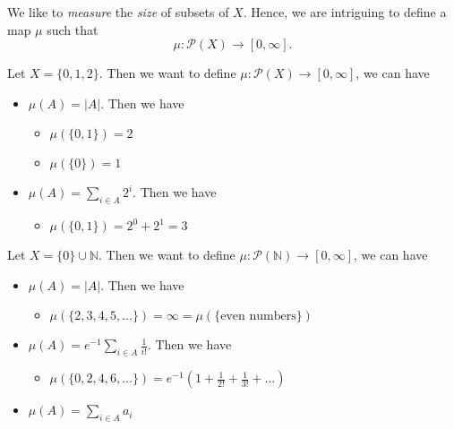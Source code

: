 We like to \emph{measure} the \emph{size} of subsets of \(X\). Hence, we are intriguing to define a map \(\mu\) such that
\[
	\mu\colon \mathcal{P}(X) \to [0, \infty].
\]
\begin{eg}
	Let \(X = \{0, 1, 2\}\). Then we want to define \(\mu\colon \mathcal{P}(X)\to [0, \infty] \), we can have
	\begin{itemize}
		\item \(\mu(A) = \vert A \vert\). Then we have
		      \begin{itemize}
			      \item \(\mu(\{0, 1\}) = 2\)
			      \item \(\mu(\{0\}) = 1\)
		      \end{itemize}
		\item \(\mu(A) = \sum_{i\in A} 2^i\). Then we have
		      \begin{itemize}
			      \item \(\mu(\{0, 1\}) = 2^0 + 2^1 = 3\)
		      \end{itemize}
	\end{itemize}
\end{eg}
\begin{eg}
	Let \(X = \{0\}\cup \mathbb{N} \). Then we want to define \(\mu\colon \mathcal{P}(\mathbb{N} )\to [0, \infty] \), we can have
	\begin{itemize}
		\item \(\mu(A) = \vert A \vert\). Then we have
		      \begin{itemize}
			      \item \(\mu(\{2, 3, 4, 5, \dots  \}) = \infty = \mu(\{\text{even numbers} \})\)
		      \end{itemize}
		\item \(\mu(A) = e^{-1}\sum_{i\in A}\frac{1}{i!}\). Then we have
		      \begin{itemize}
			      \item \(\mu(\{0, 2, 4, 6, \dots \}) = e^{-1} \left(1+\frac{1}{2!}+\frac{1}{3!}+\dots  \right)\)
		      \end{itemize}
		\item \(\mu(A) = \sum_{i\in A} a_{i}\)
	\end{itemize}
\end{eg}
